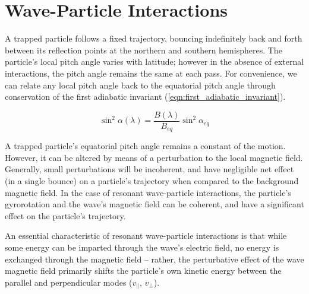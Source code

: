 \section{Wave-Particle Interactions}
\label{section:wpi}
A trapped particle follows a fixed trajectory, bouncing indefinitely back and forth between its reflection points at the northern and southern hemispheres. The particle's local pitch angle varies with latitude; however in the absence of external interactions, the pitch angle remains the same at each pass. For convenience, we can relate any local pitch angle back to the equatorial pitch angle through conservation of the first adiabatic invariant (\ref{eqn:first_adiabatic_invariant}).

\begin{equation}
\sin^2 \alpha (\lambda) = \frac{B(\lambda)}{B_{eq}} \sin^2 \alpha_{eq}
\end{equation}

A trapped particle's equatorial pitch angle remains a constant of the motion. However, it can be altered by means of a perturbation to the local magnetic field. Generally, small perturbations will be incoherent, and have negligible net effect (in a single bounce) on a particle's trajectory when compared to the background magnetic field. In the case of resonant wave-particle interactions, the particle's gyrorotation and the wave's magnetic field can be coherent, and have a significant effect on the particle's trajectory.

An essential characteristic of resonant wave-particle interactions is that while some energy can be imparted through the wave's electric field, no energy is exchanged through the magnetic field -- rather, the perturbative effect of the wave magnetic field primarily shifts the particle's own kinetic energy between the parallel and perpendicular modes ($v_\parallel$, $v_\perp$). 

